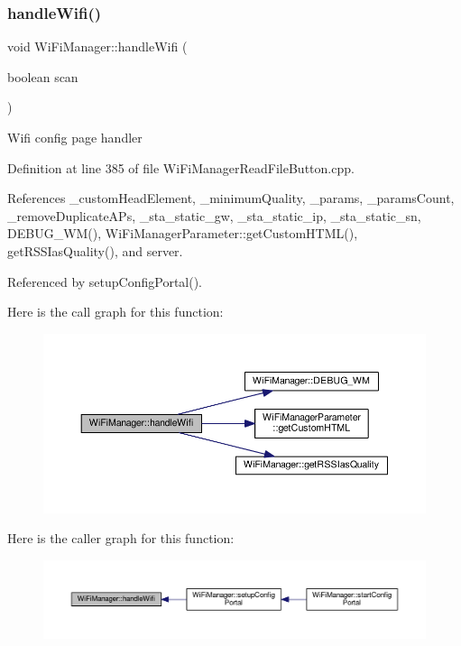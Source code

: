 \subsubsection{\texorpdfstring{handle\+Wifi()}{handleWifi()}}
{\footnotesize\ttfamily void Wi\+Fi\+Manager\+::handle\+Wifi (\begin{DoxyParamCaption}\item[{boolean}]{scan }\end{DoxyParamCaption})\hspace{0.3cm}{\ttfamily [private]}}

Wifi config page handler 

Definition at line 385 of file Wi\+Fi\+Manager\+Read\+File\+Button.\+cpp.



References \+\_\+custom\+Head\+Element, \+\_\+minimum\+Quality, \+\_\+params, \+\_\+params\+Count, \+\_\+remove\+Duplicate\+A\+Ps, \+\_\+sta\+\_\+static\+\_\+gw, \+\_\+sta\+\_\+static\+\_\+ip, \+\_\+sta\+\_\+static\+\_\+sn, D\+E\+B\+U\+G\+\_\+\+W\+M(), Wi\+Fi\+Manager\+Parameter\+::get\+Custom\+H\+T\+M\+L(), get\+R\+S\+S\+Ias\+Quality(), and server.



Referenced by setup\+Config\+Portal().

Here is the call graph for this function\+:\nopagebreak
\begin{figure}[H]
\begin{center}
\leavevmode
\includegraphics[width=350pt]{d4/dc8/class_wi_fi_manager_a57a9048175c1918340ab9d0a2c53601f_cgraph}
\end{center}
\end{figure}
Here is the caller graph for this function\+:\nopagebreak
\begin{figure}[H]
\begin{center}
\leavevmode
\includegraphics[width=350pt]{d4/dc8/class_wi_fi_manager_a57a9048175c1918340ab9d0a2c53601f_icgraph}
\end{center}
\end{figure}
\mbox{\label{class_wi_fi_manager_a2a8c2b60aa86dfdeab8a1a90f7122dc7}} 
